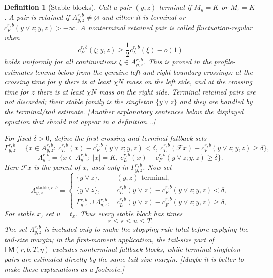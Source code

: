 \documentclass[11pt]{article}
\newtheorem{defi}{Definition}
\newcommand{\stable}{\mathrm{stable}}
\newcommand{\jscomment}[1]{\textup{\textsf{\color{blue}[#1]}}}
\begin{document}
\begin{defi}[Stable blocks]
Call a pair \((y,z)\) terminal if \(M_y=K\) or \(M_z=K\). A pair is
retained if \(A_{y,z}^{r,b}\ne\varnothing\) and either it is terminal or
\(c_F^{r,b}(y\vee z;y,z)>-\infty\). A nonterminal retained pair is called
fluctuation-regular when
\[
    c_F^{r,b}(\xi;y,z)\ge \frac12c_L^{r,b}(\xi)-o(1)
\]
holds uniformly for all continuations \(\xi\in A_{y,z}^{r,b}\). This is
proved in the profile-estimates lemma below from the genuine left and
right boundary crossings:
at the crossing time for \(y\) there is at least \(\chi N\) mass on the
left side, and at the crossing time for \(z\) there is at least
\(\chi N\) mass on the right side. Terminal retained pairs are not
discarded; their stable family is the singleton \(\{y\vee z\}\) and they
are handled by the terminal/tail estimate. \jscomment{Another explanatory sentences below the displayed equation that should not appear in a definition...}

For fixed \(\delta>0\), define the first-crossing and terminal-fallback sets
\[
    \Gamma_{y,z}^{r,b}
    =
    \{x\in A_{y,z}^{r,b}:\
    c_L^{r,b}(x)-c_F^{r,b}(y\vee z;y,z)<\delta,\
    c_L^{r,b}(\mathcal F x)-c_F^{r,b}(y\vee z;y,z)\ge\delta\},
\]
\[
    \Lambda_{y,z}^{r,b}
    =
    \{x\in A_{y,z}^{r,b}:\ |x|=K,\
    c_L^{r,b}(x)-c_F^{r,b}(y\vee z;y,z)\ge\delta\}.
\]
Here \(\mathcal F x\) is the parent of \(x\), used only in \(\Gamma_{y,z}^{r,b}\). Now set
\[
    A_{y,z}^{\stable,r,b}
    =
    \begin{cases}
    \{y\vee z\},
    & \text{\((y,z)\) terminal},\\[4pt]
    \{y\vee z\},
    & c_L^{r,b}(y\vee z)-c_F^{r,b}(y\vee z;y,z)<\delta,\\[4pt]
    \Gamma_{y,z}^{r,b}\cup\Lambda_{y,z}^{r,b},
    & c_L^{r,b}(y\vee z)-c_F^{r,b}(y\vee z;y,z)\ge\delta,
    \end{cases}
\]
For stable \(x\), set \(u=t_x\). Thus every stable block has times
\[
    r\le s\le u\le T.
\]
The set \(\Lambda_{y,z}^{r,b}\) is included only to make the stopping
rule total before applying the tail-size margin; in the first-moment
application, the tail-size part of \(\mathsf{FM}(r,b,T,\eta)\) excludes
nonterminal fallback blocks, while terminal singleton pairs are estimated
directly by the same tail-size margin. \jscomment{Maybe it is better to make these explanations as a footnote.}
\end{defi}
\end{document}
